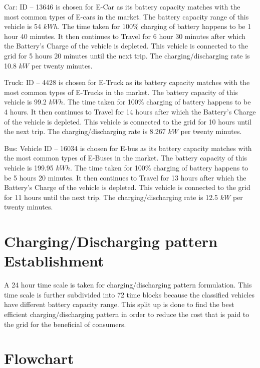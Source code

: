 	Car: ID – 13646 \cite{evdata} is chosen for E-Car as its battery capacity matches with the most common types of E-cars in the market. The
	battery capacity range of this vehicle is 54 $kWh$. The time taken for 100\% charging of battery
	happens to be 1 hour 40 minutes. It then continues to Travel for 6 hour 30 minutes after which the Battery's Charge of the vehicle is depleted. This vehicle is connected to the grid for 5 hours 20 minutes until the next trip. The charging/discharging rate is 10.8 $kW$ per twenty minutes.
	
	Truck: ID – 4428 \cite{evdata} is chosen for E-Truck as its battery capacity matches with the most common types of E-Trucks in the market. The
	battery capacity of this vehicle is 99.2 $kWh$. The time taken for 100\% charging of battery
	happens to be 4 hours. It then continues to Travel for 14 hours after which the Battery's Charge of the vehicle is depleted. This vehicle is connected to the grid for 10 hours until the next trip. The charging/discharging rate is 8.267 $kW$ per twenty minutes.
	
	Bus: Vehicle ID – 16034 \cite{evdata} is chosen for E-bus as its battery capacity matches with the most common types of E-Buses in the market. The
	battery capacity of this vehicle is 199.95 $kWh$. The time taken for 100\% charging of battery
	happens to be 5 hours 20 minutes. It then continues to Travel for 13 hours after which the Battery's Charge of the vehicle is depleted. This vehicle is connected to the grid for 11 hours until the next trip. The charging/discharging rate is 12.5 $kW$ per twenty minutes.
	



	\section{Charging/Discharging pattern Establishment}
	
	A 24 hour time scale is taken for charging/discharging pattern formulation. This time scale is further subdivided into 72 time blocks  because the classified vehicles have different battery
	capacity range. This split up is done to find the best efficient charging/discharging pattern in
	order to reduce the cost that is paid to the grid for the beneficial of consumers.
	
	\section{Flowchart}
	
